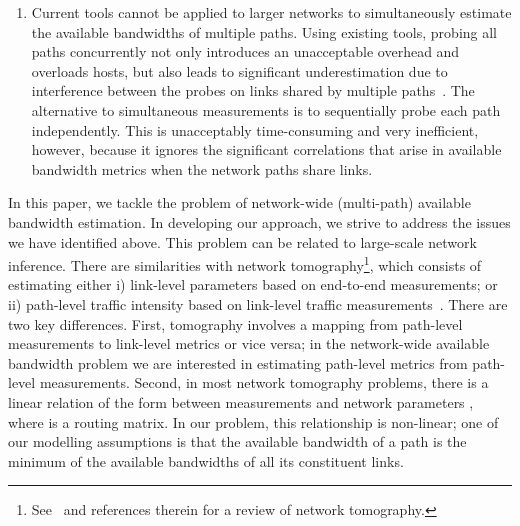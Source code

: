 \documentclass[final,5p,times,twocolumn]{elsarticle}
\begin{document}
\begin{enumerate}
	\item Current tools cannot be applied to larger networks to simultaneously estimate the available bandwidths of multiple paths.  Using existing tools, probing all paths concurrently not only introduces an unacceptable overhead and overloads hosts, but also leads to significant underestimation due to interference between the probes on links shared by multiple paths~\cite{cro:09}. The alternative to simultaneous measurements is to sequentially probe each path independently. This is unacceptably time-consuming and very inefficient, however, because it ignores the significant correlations that arise in available bandwidth metrics when the network paths share links.
\end{enumerate}

In this paper, we tackle the problem of network-wide (multi-path) available bandwidth estimation. In developing our approach, we strive to address the issues we have identified above. This problem can be related to large-scale network inference. There are similarities with network tomography\footnote{See~\cite{cas:04} and references therein for a review of network tomography.}, which consists of estimating either i) link-level parameters based on end-to-end measurements; or ii) path-level traffic intensity based on link-level traffic measurements~\cite{var:96}.  There are two key differences. First, tomography involves a mapping from path-level measurements to link-level metrics or vice versa; in the network-wide available bandwidth problem we are interested in estimating path-level metrics from path-level measurements. Second, in most network tomography problems, there is a linear relation of the form  between measurements  and network parameters , where  is a routing matrix. In our problem, 
this relationship is non-linear; one of our modelling assumptions is that the available bandwidth of a path is the minimum of the available bandwidths of all its constituent links. 
\end{document}

